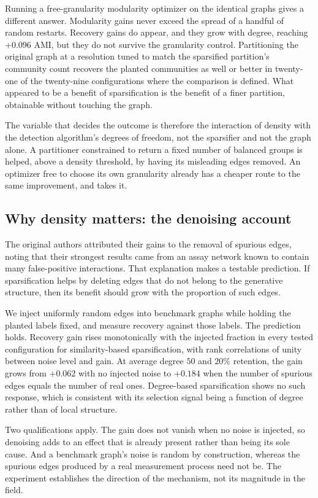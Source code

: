 Running a free-granularity modularity optimizer on the identical graphs gives a
different answer. Modularity gains never exceed the spread of a handful of random
restarts. Recovery gains do appear, and they grow with degree, reaching $+0.096$
AMI, but they do not survive the granularity control. Partitioning the original
graph at a resolution tuned to match the sparsified partition's community count
recovers the planted communities as well or better in twenty-one of the
twenty-nine configurations where the comparison is defined. What appeared to be a
benefit of sparsification is the benefit of a finer partition, obtainable without
touching the graph.

The variable that decides the outcome is therefore the interaction of density
with the detection algorithm's degrees of freedom, not the sparsifier and not the
graph alone. A partitioner constrained to return a fixed number of balanced
groups is helped, above a density threshold, by having its misleading edges
removed. An optimizer free to choose its own granularity already has a cheaper
route to the same improvement, and takes it.

\subsection{Why density matters: the denoising account}

The original authors attributed their gains to the removal of spurious edges,
noting that their strongest results came from an assay network known to contain
many false-positive interactions. That explanation makes a testable prediction.
If sparsification helps by deleting edges that do not belong to the generative
structure, then its benefit should grow with the proportion of such edges.

We inject uniformly random edges into benchmark graphs while holding the planted
labels fixed, and measure recovery against those labels. The prediction holds.
Recovery gain rises monotonically with the injected fraction in every tested
configuration for similarity-based sparsification, with rank correlations of
unity between noise level and gain. At average degree $50$ and $20\%$ retention,
the gain grows from $+0.062$ with no injected noise to $+0.184$ when the number
of spurious edges equals the number of real ones. Degree-based sparsification
shows no such response, which is consistent with its selection signal being a
function of degree rather than of local structure.

Two qualifications apply. The gain does not vanish when no noise is injected, so
denoising adds to an effect that is already present rather than being its sole
cause. And a benchmark graph's noise is random by construction, whereas the
spurious edges produced by a real measurement process need not be. The experiment
establishes the direction of the mechanism, not its magnitude in the field.

